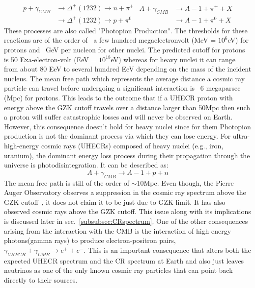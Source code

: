 \begin{equation}\label{eq:GZK}
  \begin{split}
    p + \gamma_{CMB} &\longrightarrow \Delta^+(1232 ) \longrightarrow n+\pi^+ \\ 
                     &\longrightarrow \Delta^+(1232 ) \longrightarrow p+\pi^0
  \end{split} 
  \begin{split}
    A + \gamma_{CMB} &\longrightarrow A-1 + \pi^+ + X \\ 
                     &\longrightarrow A-1 + \pi^0 + X
  \end{split} 
\end{equation}
These processes are also called "Photopion Production". The thresholds for these reactions are of the order of ~a few hundred megaelectronvolt (MeV = $10^6$eV) for protons and ~GeV per nucleon for other nuclei. The predicted cutoff for protons is 50 Exa-electron-volt (EeV = $10^{18}$eV) whereas for heavy nuclei it can range from about 80 EeV to several hundred EeV depending on the mass of the incident nucleus. The mean free path which represents the average distance a cosmic ray particle can travel before undergoing a significant interaction is ~6 megaparsec (Mpc) for protons. This leads to the outcome that if a UHECR proton with energy above the GZK cutoff travels over a distance larger than 50Mpc then such a proton will suffer catastrophic losses and will never be observed on Earth. However, this consequence doesn't hold for heavy nuclei since for them Photopion production is not the dominant process via which they can lose energy. For ultra-high-energy cosmic rays (UHECRs) composed of heavy nuclei (e.g., iron, uranium), the dominant energy loss process during their propagation through the universe is photodisintegration. It can be described as:
\begin{equation}\label{eq:Pdisinteg}
    A + \gamma_{CMB} \longrightarrow A-1 + p + n  
\end{equation}
The mean free path is still of the order of $\sim$10Mpc.
Even though, the Pierre Auger Observatory observes a suppression in the cosmic ray spectrum above the GZK cutoff~\cite{KAMPERT2014318}, it does not claim it to be just due to GZK limit. It has also observed cosmic rays above the GZK cutoff. This issue along with its implications is discussed later in sec.~\ref{subsubsec:CRspectrum}. One of the other consequences arising from the interaction with the CMB is the interaction of high energy photons(gamma rays) to produce electron-positron pairs, $\gamma_{UHECR} + \gamma_{CMB} \longrightarrow e^+ + e^- $. This is an important consequence that alters both the expected UHECR spectrum and the CR spectrum at Earth and also just leaves neutrinos as one of the only known cosmic ray particles that can point back directly to their sources.

